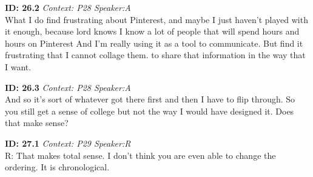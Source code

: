 \documentclass[10pt]{book}
\begin{document}
\begin{landscape}
\textbf{ID: 26.2} \emph{Context: P28 Speaker:A}\\ 
What I do find frustrating about Pinterest, and maybe I just haven't played with it enough, because lord knows I know a lot of people that will spend hours and hours on Pinterest  And I'm really using it as a tool to communicate. But find it frustrating that I cannot collage them. to share that information in the way that I want. \newpage 

\textbf{ID: 26.3} \emph{Context: P28 Speaker:A}\\ 
And so it's sort of whatever got there first and then I have to flip through. So you still get a sense of college but not the way I would have designed it. Does that make sense? \newpage 

\textbf{ID: 27.1} \emph{Context: P29 Speaker:R}\\ 
R: That makes total sense. I don't think you are even able to change the ordering. It is chronological. \newpage 

\end{landscape}
\end{document}
